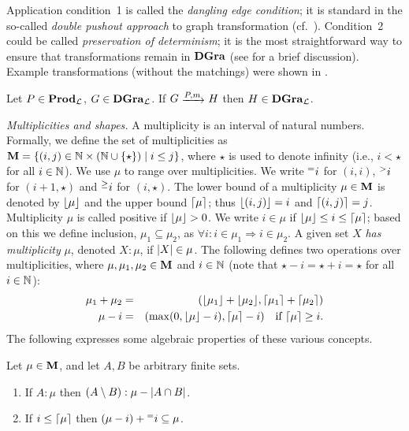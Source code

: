 %
Application condition~1 is called the \emph{dangling edge condition}; it is
standard in the so-called \emph{double pushout approach} to graph
transformation (cf.\ \cite{DPO}). Condition~2 could be called
\emph{preservation of determinism}; it is the most straightforward way to
ensure that transformations remain in $\mathbf{DGra}$ (see
 for a brief discussion). Example transformations (without the matchings) were shown in
.
%
\begin{proposition}
  Let $P\in \mathbf{Prod}_{\cal L}$, $G\in \mathbf{DGra}_{\cal L}$. If $G\trans{P,m} H$ then $H\in
  \mathbf{DGra}_{\cal L}$.
\end{proposition}
%
\textit{Multiplicities and shapes.}
%
A multiplicity is an interval of natural numbers. Formally, we define the
set of multiplicities as $\mathbf{M} = {\textstyle\mathopen\{ (i,j)\in \mathbb{N} \times (\mathbb{N} \cup
{\{ \star \}}) \mid i\leq j \mathclose\}}$, where $\star$ is used to denote infinity (i.e.,
$i<\star$ for all $i\in \mathbb{N}$).  We use $\mu$ to range over multiplicities.  We
write ${{}^{=}{i}}$ for $(i,i)$, ${{}^{>}{i}}$ for $(i+1,\star)$ and ${{}^{\geq}{i}}$ for
$(i,\star)$. The lower bound of a multiplicity $\mu \in \mathbf{M}$ is denoted by
${\lfloor}{\mu}{\rfloor}$ and the upper bound ${\lceil}{\mu}{\rceil}$; thus ${\lfloor}{(i,j)}{\rfloor}=i$ and
${\lceil}{(i,j)}{\rceil}=j$. Multiplicity $\mu$ is called positive if ${\lfloor}{\mu}{\rfloor} >0$.  We
write $i\in \mu$ if ${\lfloor}{\mu}{\rfloor} \leq i \leq {\lceil}{\mu}{\rceil}$; based on this we define
inclusion, $\mu_1\subseteq \mu_2$, as $\forall i:i\in \mu_1\Rightarrow i\in
\mu_2$.  A given set $X$ {\em has multiplicity} $\mu$, denoted $X{:}\mu$, if
$|{X}|\in \mu$.
%
The following defines two operations over multiplicities, where $\mu, \mu_1,
\mu_2\in \mathbf{M}$ and $i\in \mathbb{N}$ (note that $\star-i= \star+i= \star$ for all
$i\in \mathbb{N}$):
%
\begin{eqnarray*}
\mu_1+\mu_2
 & = & ({\lfloor}{\mu_1}{\rfloor}+{\lfloor}{\mu_2}{\rfloor}, {\lceil}{\mu_1}{\rceil}+{\lceil}{\mu_2}{\rceil}) \\
\mu - i
 & = & (\max(0,{\lfloor}{\mu}{\rfloor}-i), {\lceil}{\mu}{\rceil}-i) \quad\mbox{if ${\lceil}{\mu}{\rceil} \geq i$.}
\end{eqnarray*}
%
The following expresses some algebraic properties of these various concepts.
%
\begin{proposition}
Let $\mu\in \mathbf{M}$, and let $A,B$ be arbitrary finite sets.
\begin{enumerate}\noitemsep\notopsep
\item If $A:\mu$ then $(A\setminus B):\mu-|{A\cap B}|$.
\item If $i\leq {\lceil}{\mu}{\rceil}$ then $(\mu-i)+{{}^{=}{i}}\subseteq \mu$.
\end{enumerate}
\end{proposition}
